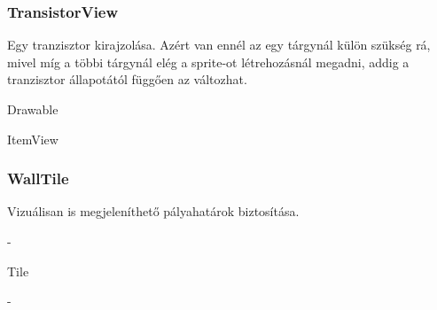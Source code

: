\subsubsection{TransistorView}
\begin{class-template-responsibility}
    Egy tranzisztor kirajzolása. Azért van ennél az egy tárgynál külön szükség rá, mivel míg a többi tárgynál elég a sprite-ot létrehozásnál megadni, addig a tranzisztor állapotától függően az változhat.
\end{class-template-responsibility}
\begin{class-template-interface}
    Drawable
\end{class-template-interface}
\begin{class-template-baseclass}
    ItemView
\end{class-template-baseclass}
\begin{class-template-attribute}
\end{class-template-attribute}
\begin{class-template-method}
\end{class-template-method}

\subsubsection{WallTile}
\begin{class-template-responsibility}
    Vizuálisan is megjeleníthető pályahatárok biztosítása.
\end{class-template-responsibility}
\begin{class-template-interface}
    -
\end{class-template-interface}
\begin{class-template-baseclass}
    Tile
\end{class-template-baseclass}
\begin{class-template-attribute}
    -
\end{class-template-attribute}
\begin{class-template-method}
\end{class-template-method}

